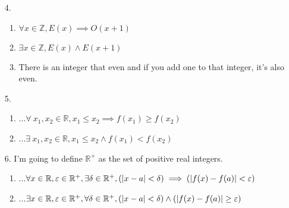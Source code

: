 \documentclass{homework}
\begin{document}
\begin{enumerate}
		\item[4.] \begin{enumerate}
			\item $\forall x \in \mathbb{Z}, E(x) \implies O(x + 1)$
			\item $\exists x \in \mathbb{Z}, E(x) \wedge E(x+1)$
			\item There is an integer that even and if you add one to that integer, it's also even.
		\end{enumerate}
	
		\item[5.] \begin{enumerate}
			\item ...$\forall \: x_1, x_2 \in \mathbb{R}, x_1 \le x_2 \implies f(x_1) \ge f(x_2)$
			\item ...$\exists \: x_1, x_2 \in \mathbb{R}, x_1 \le x_2 \wedge f(x_1) < f(x_2)$
		\end{enumerate}
	
		\item[6.] I'm going to define $\mathbb{R}^+$ as the set of positive real integers. \begin{enumerate}
			\item ...$\forall x \in \mathbb{R}, \varepsilon \in \mathbb{R^+}, \exists \delta \in \mathbb{R^+}, \left(\abs{x - a} < \delta\right) \implies \left(\abs{f(x) - f(a)} < \varepsilon \right)$
			
			\item ...$\exists x \in \mathbb{R}, \varepsilon \in \mathbb{R}^+, \forall \delta \in \mathbb{R}^+, \left(\abs{x-a} < \delta\right) \wedge \left(\abs{f(x) - f(a)} \ge \varepsilon\right)$
		\end{enumerate}
	\end{enumerate}
\end{document}
